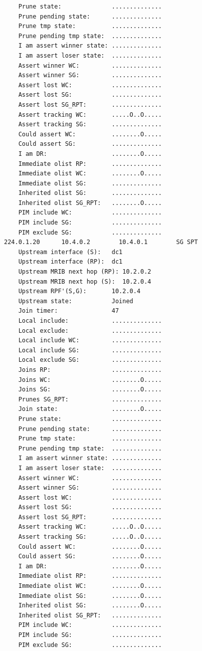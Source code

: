 \documentclass[11pt]{report}
\begin{document}
\begin{itemize}
\begin{verbatim}
    Prune state:              ..............
    Prune pending state:      ..............
    Prune tmp state:          ..............
    Prune pending tmp state:  ..............
    I am assert winner state: ..............
    I am assert loser state:  ..............
    Assert winner WC:         ..............
    Assert winner SG:         ..............
    Assert lost WC:           ..............
    Assert lost SG:           ..............
    Assert lost SG_RPT:       ..............
    Assert tracking WC:       .....O..O.....
    Assert tracking SG:       ..............
    Could assert WC:          ........O.....
    Could assert SG:          ..............
    I am DR:                  ........O.....
    Immediate olist RP:       ..............
    Immediate olist WC:       ........O.....
    Immediate olist SG:       ..............
    Inherited olist SG:       ..............
    Inherited olist SG_RPT:   ........O.....
    PIM include WC:           ..............
    PIM include SG:           ..............
    PIM exclude SG:           ..............
224.0.1.20      10.4.0.2        10.4.0.1        SG SPT 
    Upstream interface (S):   dc1
    Upstream interface (RP):  dc1
    Upstream MRIB next hop (RP): 10.2.0.2
    Upstream MRIB next hop (S):  10.2.0.4
    Upstream RPF'(S,G):       10.2.0.4
    Upstream state:           Joined 
    Join timer:               47
    Local include:            ..............
    Local exclude:            ..............
    Local include WC:         ..............
    Local include SG:         ..............
    Local exclude SG:         ..............
    Joins RP:                 ..............
    Joins WC:                 ........O.....
    Joins SG:                 ........O.....
    Prunes SG_RPT:            ..............
    Join state:               ........O.....
    Prune state:              ..............
    Prune pending state:      ..............
    Prune tmp state:          ..............
    Prune pending tmp state:  ..............
    I am assert winner state: ..............
    I am assert loser state:  ..............
    Assert winner WC:         ..............
    Assert winner SG:         ..............
    Assert lost WC:           ..............
    Assert lost SG:           ..............
    Assert lost SG_RPT:       ..............
    Assert tracking WC:       .....O..O.....
    Assert tracking SG:       .....O..O.....
    Could assert WC:          ........O.....
    Could assert SG:          ........O.....
    I am DR:                  ........O.....
    Immediate olist RP:       ..............
    Immediate olist WC:       ........O.....
    Immediate olist SG:       ........O.....
    Inherited olist SG:       ........O.....
    Inherited olist SG_RPT:   ..............
    PIM include WC:           ..............
    PIM include SG:           ..............
    PIM exclude SG:           ..............
\end{verbatim}


\end{itemize}
\end{document}
